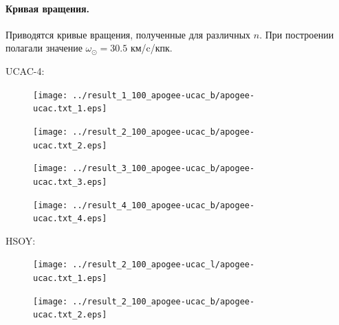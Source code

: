 \documentclass{matmex-diploma-custom}
\begin{document}
\pagebreak
\paragraph{Кривая вращения.} Приводятся кривые вращения, полученные для различных $n$. При построении полагали значение $\omega_{\odot} = 30.5$ км/c/кпк.

\par UCAC-4:
\begin{figure}[h!]
\begin{minipage}[h]{0.49\linewidth}
        \texttt{[image: ../result\_1\_100\_apogee-ucac\_b/apogee-ucac.txt\_1.eps]}
\end{minipage}
\hfill
\begin{minipage}[h]{0.49\linewidth}
        \texttt{[image: ../result\_2\_100\_apogee-ucac\_b/apogee-ucac.txt\_2.eps]}
\end{minipage}
\end{figure}
\begin{figure}[h!]
\begin{minipage}[h]{0.49\linewidth}
        \texttt{[image: ../result\_3\_100\_apogee-ucac\_b/apogee-ucac.txt\_3.eps]}
\end{minipage}
\hfill
\begin{minipage}[h]{0.49\linewidth}
        \texttt{[image: ../result\_4\_100\_apogee-ucac\_b/apogee-ucac.txt\_4.eps]}
\end{minipage}
\end{figure}

\par HSOY:
\begin{figure}[h!]
\begin{minipage}[h]{0.49\linewidth}
        \texttt{[image: ../result\_2\_100\_apogee-ucac\_l/apogee-ucac.txt\_1.eps]}
\end{minipage}
\hfill
\begin{minipage}[h]{0.49\linewidth}
        \texttt{[image: ../result\_2\_100\_apogee-ucac\_b/apogee-ucac.txt\_2.eps]}
\end{minipage}
\end{figure}

\pagebreak
\end{document}
